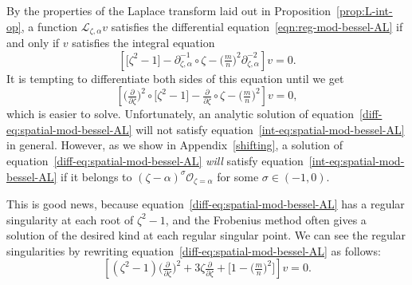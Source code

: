 \documentclass{article}
\newcommand{\fracderiv}[3]{\partial^{#1}_{#2, #3}}
\newcommand{\laplace}{\mathcal{L}}
\theoremstyle{definition}
\theoremstyle{plain}
\begin{document}
By the properties of the Laplace transform laid out in Proposition~\ref{prop:L-int-op}, a function $\laplace_{\zeta, \alpha} v$ satisfies the differential equation~\eqref{eqn:reg-mod-bessel-AL} if and only if $v$ satisfies the integral equation
\begin{equation}\label{int-eq:spatial-mod-bessel-AL}
\left[ \big[ \zeta^2 - 1 \big] - \fracderiv{-1}{\zeta}{\alpha} \circ \zeta - \big(\tfrac{m}{n}\big)^2 \fracderiv{-2}{\zeta}{\alpha} \right] v = 0.
\end{equation}
It is tempting to differentiate both sides of this equation until we get
\begin{equation}\label{diff-eq:spatial-mod-bessel-AL}
\left[ \big(\tfrac{\partial}{\partial \zeta}\big)^2 \circ \big[ \zeta^2 - 1 \big] - \tfrac{\partial}{\partial \zeta} \circ \zeta - \big(\tfrac{m}{n}\big)^2 \right] v = 0,
\end{equation}
which is easier to solve. Unfortunately, an analytic solution of equation~\eqref{diff-eq:spatial-mod-bessel-AL} will not satisfy equation~\eqref{int-eq:spatial-mod-bessel-AL} in general. However, as we show in Appendix~\ref{shifting}, a solution of equation~\eqref{diff-eq:spatial-mod-bessel-AL} {\em will} satisfy equation~\eqref{int-eq:spatial-mod-bessel-AL} if it belongs to $(\zeta - \alpha)^\sigma \mathcal{O}_{\zeta = \alpha}$ for some $\sigma \in (-1, 0)$.

This is good news, because equation~\eqref{diff-eq:spatial-mod-bessel-AL} has a regular singularity at each root of $\zeta^2 - 1$, and the Frobenius method often gives a solution of the desired kind at each regular singular point. We can see the regular singularities by rewriting equation~\eqref{diff-eq:spatial-mod-bessel-AL} as follows:
\[ \left[ (\zeta^2 - 1) \big(\tfrac{\partial}{\partial \zeta}\big)^2 + 3\zeta \tfrac{\partial}{\partial \zeta} + \big[ 1 - \big(\tfrac{m}{n}\big)^2 \big] \right] v = 0. \]
\end{document}
